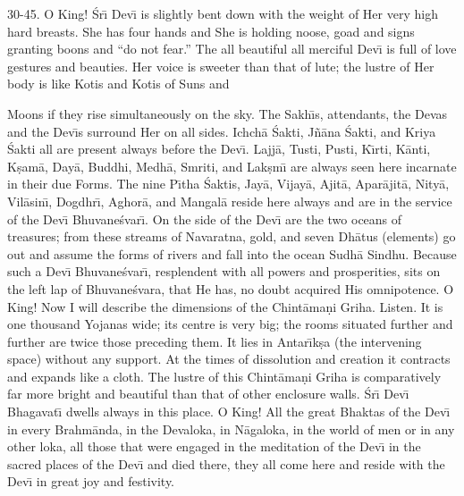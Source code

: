 30-45. O King! \'Sr\={\i} Dev\={\i} is slightly bent down with the weight of Her very high hard breasts. She has four hands and She is holding noose, goad and signs granting boons and ``do not fear.'' The all beautiful all merciful Dev\={\i} is full of love gestures and beauties. Her voice is sweeter than that of lute; the lustre of Her body is like Kotis and Kotis of Suns and

Moons if they rise simultaneously on the sky. The Sakh\={\i}s, attendants, the Devas and the Dev\={\i}s surround Her on all sides. Ichch\=a \'Sakti, J\~n\=ana \'Sakti, and Kriya \'Sakti all are present always before the Dev\={\i}. Lajj\=a, Tusti, Pusti, K\={\i}rti, K\=anti, K\d{s}am\=a, Day\=a, Buddhi, Medh\=a, Smriti, and Lak\d{s}m\={\i} are always seen here incarnate in their due Forms. The nine P\={\i}tha \'Saktis, Jay\=a, Vijay\=a, Ajit\=a, Apar\=ajit\=a, Nity\=a, Vil\=asin\={\i}, Dogdhr\={\i}, Aghor\=a, and Mangal\=a reside here always and are in the service of the Dev\={\i} Bhuvane\'svar\={\i}. On the side of the Dev\={\i} are the two oceans of treasures; from these streams of Navaratna, gold, and seven Dh\=atus (elements) go out and assume the forms of rivers and fall into the ocean Sudh\=a Sindhu. Because such a Dev\={\i} Bhuvane\'svar\={\i}, resplendent with all powers and prosperities, sits on the left lap of Bhuvane\'svara, that He has, no doubt acquired His omnipotence. O King! Now I will describe the dimensions of the Chint\=ama\d{n}i Griha. Listen. It is one thousand Yojanas wide; its centre is very big; the rooms situated further and further are twice those preceding them. It lies in Antar\={\i}k\d{s}a (the intervening space) without any support. At the times of dissolution and creation it contracts and expands like a cloth. The lustre of this Chint\=ama\d{n}i Griha is comparatively far more bright and beautiful than that of other enclosure walls. \'Sr\={\i} Dev\={\i} Bhagavat\={\i} dwells always in this place. O King! All the great Bhaktas of the Dev\={\i} in every Brahm\=anda, in the Devaloka, in N\=agaloka, in the world of men or in any other loka, all those that were engaged in the meditation of the Dev\={\i} in the sacred places of the Dev\={\i} and died there, they all come here and reside with the Dev\={\i} in great joy and festivity.

